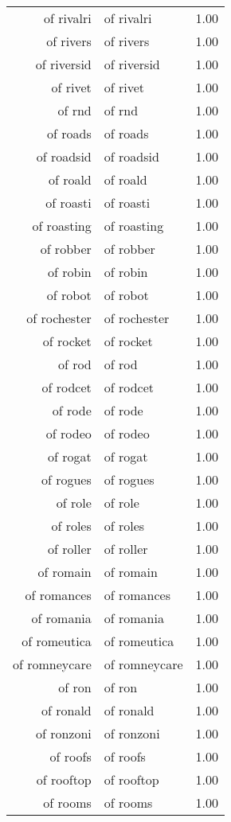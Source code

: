 \begin{table}[ht]
\begin{tabular}{rlr}
  of rivalri & of rivalri & 1.00 \\ 
  of rivers & of rivers & 1.00 \\ 
  of riversid & of riversid & 1.00 \\ 
  of rivet & of rivet & 1.00 \\ 
  of rnd & of rnd & 1.00 \\ 
  of roads & of roads & 1.00 \\ 
  of roadsid & of roadsid & 1.00 \\ 
  of roald & of roald & 1.00 \\ 
  of roasti & of roasti & 1.00 \\ 
  of roasting & of roasting & 1.00 \\ 
  of robber & of robber & 1.00 \\ 
  of robin & of robin & 1.00 \\ 
  of robot & of robot & 1.00 \\ 
  of rochester & of rochester & 1.00 \\ 
  of rocket & of rocket & 1.00 \\ 
  of rod & of rod & 1.00 \\ 
  of rodcet & of rodcet & 1.00 \\ 
  of rode & of rode & 1.00 \\ 
  of rodeo & of rodeo & 1.00 \\ 
  of rogat & of rogat & 1.00 \\ 
  of rogues & of rogues & 1.00 \\ 
  of role & of role & 1.00 \\ 
  of roles & of roles & 1.00 \\ 
  of roller & of roller & 1.00 \\ 
  of romain & of romain & 1.00 \\ 
  of romances & of romances & 1.00 \\ 
  of romania & of romania & 1.00 \\ 
  of romeutica & of romeutica & 1.00 \\ 
  of romneycare & of romneycare & 1.00 \\ 
  of ron & of ron & 1.00 \\ 
  of ronald & of ronald & 1.00 \\ 
  of ronzoni & of ronzoni & 1.00 \\ 
  of roofs & of roofs & 1.00 \\ 
  of rooftop & of rooftop & 1.00 \\ 
  of rooms & of rooms & 1.00 \\ 

\end{tabular}
\end{table}
